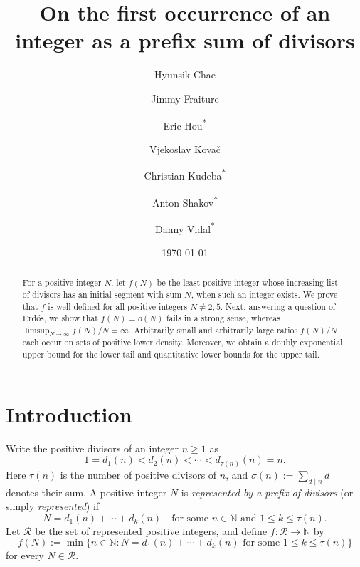 \documentclass[11pt,letterpaper,reqno]{amsart}
\title{On the first occurrence of an integer as a prefix sum of divisors}
\author[Chae]{Hyunsik Chae}
\author[Fraiture]{Jimmy Fraiture}
\author[Hou]{Eric Hou\textsuperscript{*}}
\author[Kova\v{c}]{Vjekoslav Kova\v{c}}
\author[Kudeba]{Christian Kudeba\textsuperscript{*}}
\author[Shakov]{Anton Shakov\textsuperscript{*}}
\author[Vidal]{Danny Vidal\textsuperscript{*}}
\date{\today}
\numberwithin{equation}{section}
\theoremstyle{remark}
\newcommand{\N}{\mathbb{N}}
\newcommand{\Rcal}{\mathcal{R}}
\renewcommand{\leq}{\leqslant}
\renewcommand{\geq}{\geqslant}
\begin{document}
\begin{abstract}
For a positive integer $N$, let $f(N)$ be the least positive integer whose increasing list of divisors has an initial segment with sum $N$, when such an integer exists. We prove that $f$ is well-defined for all positive integers $N\neq2,5$. Next, answering a question of Erd\H{o}s, we show that $f(N)=o(N)$ fails in a strong sense, whereas $\limsup_{N\to\infty}f(N)/N=\infty$. Arbitrarily small and arbitrarily large ratios $f(N)/N$ each occur on sets of positive lower density. Moreover, we obtain a doubly exponential upper bound for the lower tail and quantitative lower bounds for the upper tail.
\end{abstract}



\maketitle

\tableofcontents

\section{Introduction}\label{sec:introduction}

Write the positive divisors of an integer $n\geq1$ as
\[
 1=d_1(n)<d_2(n)<\cdots<d_{\tau(n)}(n)=n.
\]
Here $\tau(n)$ is the number of positive divisors of $n$, and
$\sigma(n):=\sum_{d\mid n}d$ denotes their sum.
A positive integer $N$ is \emph{represented by a prefix of divisors} (or simply \emph{represented}) if
\[
 N=d_1(n)+\cdots+d_k(n)
 \quad\text{for some }n\in\N\text{ and } 1\leq k\leq\tau(n).
\]
Let $\Rcal$ be the set of represented positive integers, and define $f\colon\Rcal\to\N$ by
\[
 f(N):=\min\{n\in\N : N=d_1(n)+\cdots+d_k(n)
 \text{ for some }1\leq k\leq\tau(n)\}
\]
for every $N\in\Rcal$.
\end{document}
